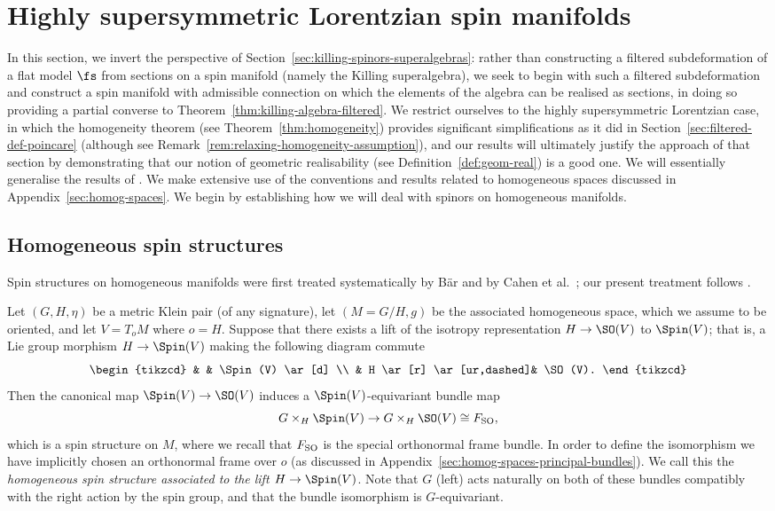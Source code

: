 \section{Highly supersymmetric Lorentzian spin manifolds}
\label{sec:high-susy-spin-mfld}

In this section, we invert the perspective of Section~\ref{sec:killing-spinors-superalgebras}: rather than constructing a filtered subdeformation of a flat model $\fs$ from sections on a spin manifold (namely the Killing superalgebra), we seek to begin with such a filtered subdeformation and construct a spin manifold with admissible connection on which the elements of the algebra can be realised as sections, in doing so providing a partial converse to Theorem~\ref{thm:killing-algebra-filtered}. We restrict ourselves to the highly supersymmetric Lorentzian case, in which the homogeneity theorem (see Theorem~\ref{thm:homogeneity}) provides significant simplifications as it did in Section~\ref{sec:filtered-def-poincare} (although see Remark~\ref{rem:relaxing-homogeneity-assumption}), and our results will ultimately justify the approach of that section by demonstrating that our notion of geometric realisability (see Definition~\ref{def:geom-real}) is a good one. We will essentially generalise the results of \cite[Section~3.3]{Figueroa-OFarrill2017_1}. We make extensive use of the conventions and results related to homogeneous spaces discussed in Appendix~\ref{sec:homog-spaces}. We begin by establishing how we will deal with spinors on homogeneous manifolds.

\subsection{Homogeneous spin structures}
\label{sec:homogeneous-spin-mfld}

Spin structures on homogeneous manifolds were first treated systematically by B\"ar \cite{Bar1992} and by Cahen et al.\ \cite{Cahen1993}; our present treatment follows \cite{Figueroa-OFarrill2017_1}.

Let $(G,H,\eta)$ be a metric Klein pair (of any signature), let $(M=G/H,g)$ be the associated homogeneous space, which we assume to be oriented, and let $V=T_oM$ where $o=H$. Suppose that there exists a lift of the isotropy representation $H\to\SO(V)$ to $\Spin(V)$; that is, a Lie group morphism $H\to\Spin(V)$ making the following diagram commute
\[
\begin{tikzcd}
	&	& \Spin(V) \ar[d]	\\
	& H	\ar[r] \ar[ur,dashed]& \SO(V).
\end{tikzcd}
\]
Then the canonical map $\Spin(V)\to\SO(V)$ induces a $\Spin(V)$-equivariant bundle map
\[
	G\times_H\Spin(V)\to G\times_H\SO(V) \cong F_{\rm SO},
\]
which is a spin structure on $M$, where we recall that $F_{\rm SO}$ is the special orthonormal frame bundle. In order to define the isomorphism we have implicitly chosen an orthonormal frame over $o$ (as discussed in Appendix~\ref{sec:homog-spaces-principal-bundles}). We call this the \emph{homogeneous spin structure associated to the lift $H\to\Spin(V)$}. Note that $G$ (left) acts naturally on both of these bundles compatibly with the right action by the spin group, and that the bundle isomorphism is $G$-equivariant.

